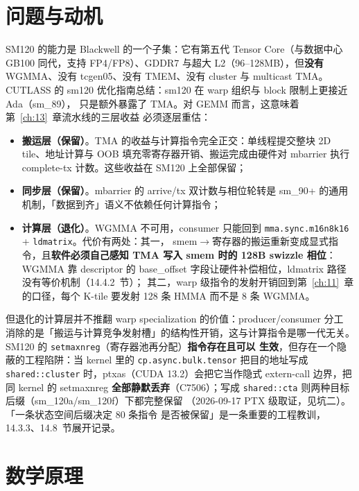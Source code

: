 \section{问题与动机}

SM120 的能力是 Blackwell 的一个子集：它有第五代 Tensor Core（与数据中心
GB100 同代，支持 FP4/FP8）、GDDR7 与超大 L2（96--128MB），但\textbf{没有}
WGMMA、没有 tcgen05、没有 TMEM、没有 cluster 与 multicast TMA。CUTLASS 的
sm120 优化指南总结：sm120 在 warp 组织与 block 限制上更接近 Ada（sm\_89），
只是额外暴露了 TMA。对 GEMM 而言，这意味着第~\ref{ch:13}~章流水线的三层收益
必须逐层重估：

\begin{itemize}
  \item \textbf{搬运层（保留）}。TMA 的收益与计算指令完全正交：单线程提交整块
        2D tile、地址计算与 OOB 填充零寄存器开销、搬运完成由硬件对 mbarrier
        执行 complete-tx 计数。这些收益在 SM120 上全部保留；
  \item \textbf{同步层（保留）}。mbarrier 的 arrive/tx 双计数与相位轮转是
        sm\_90+ 的通用机制，「数据到齐」语义不依赖任何计算指令；
  \item \textbf{计算层（退化）}。WGMMA 不可用，consumer 只能回到
        \texttt{mma.\allowbreak{}sync.\allowbreak{}m16n8k16} + \texttt{ldmatrix}。代价有两处：其一，
        smem$\to$寄存器的搬运重新变成显式指令，且\textbf{软件必须自己感知 TMA
        写入 smem 时的 128B swizzle 相位}：WGMMA 靠 descriptor 的
        base\_offset 字段让硬件补偿相位，ldmatrix 路径没有等价机制（14.4.2~节）；
        其二，warp 级指令的发射开销回到第~\ref{ch:11}~章的口径，每个
        K-tile 要发射 128 条 HMMA 而不是 8 条 WGMMA。
\end{itemize}

但退化的计算层并不推翻 warp specialization 的价值：producer/consumer 分工
消除的是「搬运与计算竞争发射槽」的结构性开销，这与计算指令是哪一代无关。
SM120 的 \texttt{setmaxnreg}（寄存器池再分配）\textbf{指令存在且可以
生效}，但存在一个隐蔽的工程陷阱：当 kernel 里的
\texttt{cp.\allowbreak{}async.\allowbreak{}bulk.\allowbreak{}tensor} 把目的地址写成
\texttt{shared::cluster} 时，ptxas（CUDA 13.2）会把它当作隐式 extern-call
边界，把同 kernel 的 setmaxnreg \textbf{全部静默丢弃}（C7506）；写成
\texttt{shared::cta} 则两种目标后缀（sm\_120a/sm\_120f）下都完整保留
（2026-09-17 PTX 级取证，见坑二）。「一条状态空间后缀决定 80 条指令
是否被保留」是一条重要的工程教训，14.3.3、14.8~节展开记录。

\section{数学原理}

